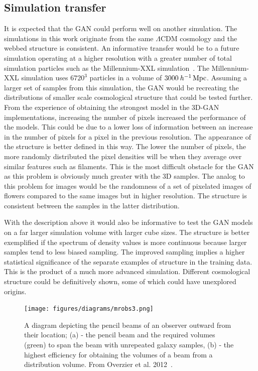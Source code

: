 \documentclass[twocolumn]{article}
\numberwithin{equation}{section}
\begin{document}
\subsection{Simulation transfer}
It is expected that the GAN could perform well on another simulation. The simulations in this work originate from the same 
$\Lambda \text{CDM}$ cosmology and the webbed structure is consistent. An informative transfer would be to a future 
simulation operating at a higher resolution with a greater number of total simulation particles such as the Millennium-XXL 
simulation~\cite{millxxlsim}. The Millennium-XXL simulation uses $6720^3$ particles in a volume of $3000 \: h^{-1} 
\,\textup{Mpc}$. Assuming a larger set of samples from this simulation, the GAN would be recreating the distributions of 
smaller scale cosmological structure that could be tested further. From the experience of obtaining the strongest model in
the 3D-GAN implementations, increasing the number of pixels increased the performance of the models. This could be due to 
a lower loss of information between an increase in the number of pixels for a pixel in the previous resolution. The 
appearance of the structure is better defined in this way. The lower the number of pixels, the more randomly distributed 
the pixel densities will be when they average over similar features such as filaments. This is the most difficult obstacle
for the GAN as this problem is obviously much greater with the 3D samples. The analog to this problem for images would be
the randomness of a set of pixelated images of flowers compared to the same images but in higher resolution. The structure
is consistent between the samples in the latter distribution. 

With the description above it would also be informative to test the GAN models on a far larger simulation volume with 
larger cube sizes. The structure is better exemplified if the spectrum of density values is more continuous because larger
samples tend to less biased sampling. The improved sampling implies a higher statistical significance of the separate 
examples of structure in the training data. This is the product of a much more advanced simulation. Different cosmological
structure could be definitively shown, some of which could have unexplored origins. 

\begin{figure}[hbt!]
\texttt{[image: figures/diagrams/mrobs3.png]}
\centering
\caption{A diagram depicting the pencil beams of an observer outward from their location; (a) - the pencil beam and the 
         required volumes (green) to span the beam with unrepeated galaxy samples, (b) - the highest efficiency for 
         obtaining the volumes of a beam from a distribution volume. From Overzier et al. 2012~\cite{MRObs}.}
\label{fig:MRObs}
\end{figure}
\end{document}
